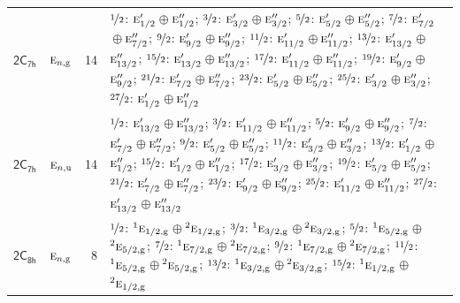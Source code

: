 \documentclass[10pt,a4paper]{article}
\numberwithin{equation}{section}
\newcommand{\grp}[1]{\mathsf{#1}}
\newcommand{\irr}[1]{\text{\normalfont\scshape #1}}
\newcommand{\conjpair}[1]{{}^{#1}}
\newcommand{\ptag}[1]{\mathrm{#1}}
\newlength{\fillwidth}\newlength{\cellwidth}\newlength{\colwidth}
\begin{document}
{\begin{longtable}{@{}llr>{\RaggedRight\arraybackslash}p{\fillwidth}@{}}
\href{2C7h.pdf}{$\grp{2C_{7h}}$} & $\irr{e}_{n,\ptag{g}}$ & 14 & $\nicefrac{1}{2}$: $\irr{e}_{1/2}'$${}\oplus{}$$\irr{e}_{1/2}''$; $\nicefrac{3}{2}$: $\irr{e}_{3/2}'$${}\oplus{}$$\irr{e}_{3/2}''$; $\nicefrac{5}{2}$: $\irr{e}_{5/2}'$${}\oplus{}$$\irr{e}_{5/2}''$; $\nicefrac{7}{2}$: $\irr{e}_{7/2}'$${}\oplus{}$$\irr{e}_{7/2}''$; $\nicefrac{9}{2}$: $\irr{e}_{9/2}'$${}\oplus{}$$\irr{e}_{9/2}''$; $\nicefrac{11}{2}$: $\irr{e}_{11/2}'$${}\oplus{}$$\irr{e}_{11/2}''$; $\nicefrac{13}{2}$: $\irr{e}_{13/2}'$${}\oplus{}$$\irr{e}_{13/2}''$; $\nicefrac{15}{2}$: $\irr{e}_{13/2}'$${}\oplus{}$$\irr{e}_{13/2}''$; $\nicefrac{17}{2}$: $\irr{e}_{11/2}'$${}\oplus{}$$\irr{e}_{11/2}''$; $\nicefrac{19}{2}$: $\irr{e}_{9/2}'$${}\oplus{}$$\irr{e}_{9/2}''$; $\nicefrac{21}{2}$: $\irr{e}_{7/2}'$${}\oplus{}$$\irr{e}_{7/2}''$; $\nicefrac{23}{2}$: $\irr{e}_{5/2}'$${}\oplus{}$$\irr{e}_{5/2}''$; $\nicefrac{25}{2}$: $\irr{e}_{3/2}'$${}\oplus{}$$\irr{e}_{3/2}''$; $\nicefrac{27}{2}$: $\irr{e}_{1/2}'$${}\oplus{}$$\irr{e}_{1/2}''$\\
\href{2C7h.pdf}{$\grp{2C_{7h}}$} & $\irr{e}_{n,\ptag{u}}$ & 14 & $\nicefrac{1}{2}$: $\irr{e}_{13/2}'$${}\oplus{}$$\irr{e}_{13/2}''$; $\nicefrac{3}{2}$: $\irr{e}_{11/2}'$${}\oplus{}$$\irr{e}_{11/2}''$; $\nicefrac{5}{2}$: $\irr{e}_{9/2}'$${}\oplus{}$$\irr{e}_{9/2}''$; $\nicefrac{7}{2}$: $\irr{e}_{7/2}'$${}\oplus{}$$\irr{e}_{7/2}''$; $\nicefrac{9}{2}$: $\irr{e}_{5/2}'$${}\oplus{}$$\irr{e}_{5/2}''$; $\nicefrac{11}{2}$: $\irr{e}_{3/2}'$${}\oplus{}$$\irr{e}_{3/2}''$; $\nicefrac{13}{2}$: $\irr{e}_{1/2}'$${}\oplus{}$$\irr{e}_{1/2}''$; $\nicefrac{15}{2}$: $\irr{e}_{1/2}'$${}\oplus{}$$\irr{e}_{1/2}''$; $\nicefrac{17}{2}$: $\irr{e}_{3/2}'$${}\oplus{}$$\irr{e}_{3/2}''$; $\nicefrac{19}{2}$: $\irr{e}_{5/2}'$${}\oplus{}$$\irr{e}_{5/2}''$; $\nicefrac{21}{2}$: $\irr{e}_{7/2}'$${}\oplus{}$$\irr{e}_{7/2}''$; $\nicefrac{23}{2}$: $\irr{e}_{9/2}'$${}\oplus{}$$\irr{e}_{9/2}''$; $\nicefrac{25}{2}$: $\irr{e}_{11/2}'$${}\oplus{}$$\irr{e}_{11/2}''$; $\nicefrac{27}{2}$: $\irr{e}_{13/2}'$${}\oplus{}$$\irr{e}_{13/2}''$\\
\href{2C8h.pdf}{$\grp{2C_{8h}}$} & $\irr{e}_{n,\ptag{g}}$ & 8 & $\nicefrac{1}{2}$: $\conjpair{1}\irr{e}_{1/2,\ptag{g}}$${}\oplus{}$$\conjpair{2}\irr{e}_{1/2,\ptag{g}}$; $\nicefrac{3}{2}$: $\conjpair{1}\irr{e}_{3/2,\ptag{g}}$${}\oplus{}$$\conjpair{2}\irr{e}_{3/2,\ptag{g}}$; $\nicefrac{5}{2}$: $\conjpair{1}\irr{e}_{5/2,\ptag{g}}$${}\oplus{}$$\conjpair{2}\irr{e}_{5/2,\ptag{g}}$; $\nicefrac{7}{2}$: $\conjpair{1}\irr{e}_{7/2,\ptag{g}}$${}\oplus{}$$\conjpair{2}\irr{e}_{7/2,\ptag{g}}$; $\nicefrac{9}{2}$: $\conjpair{1}\irr{e}_{7/2,\ptag{g}}$${}\oplus{}$$\conjpair{2}\irr{e}_{7/2,\ptag{g}}$; $\nicefrac{11}{2}$: $\conjpair{1}\irr{e}_{5/2,\ptag{g}}$${}\oplus{}$$\conjpair{2}\irr{e}_{5/2,\ptag{g}}$; $\nicefrac{13}{2}$: $\conjpair{1}\irr{e}_{3/2,\ptag{g}}$${}\oplus{}$$\conjpair{2}\irr{e}_{3/2,\ptag{g}}$; $\nicefrac{15}{2}$: $\conjpair{1}\irr{e}_{1/2,\ptag{g}}$${}\oplus{}$$\conjpair{2}\irr{e}_{1/2,\ptag{g}}$\\

\end{longtable}}
\end{document}
